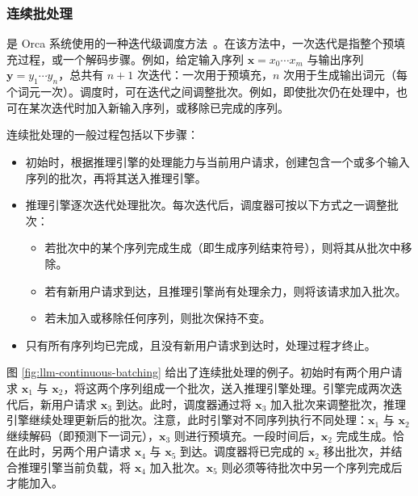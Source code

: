 \subsubsection{连续批处理}

是 Orca 系统使用的一种迭代级调度方法~\cite{yu-ettal:2022orca}。在该方法中，一次迭代是指整个预填充过程，或一个解码步骤。例如，给定输入序列 $\mathbf{x}=x_0\cdots x_m$ 与输出序列 $\mathbf{y}=y_1\cdots y_n$，总共有 $n+1$ 次迭代：一次用于预填充，$n$ 次用于生成输出词元（每个词元一次）。调度时，可在迭代之间调整批次。例如，即使批次仍在处理中，也可在某次迭代时加入新输入序列，或移除已完成的序列。

连续批处理的一般过程包括以下步骤：

\begin{itemize}
\item \vspace{0.3cm} 初始时，根据推理引擎的处理能力与当前用户请求，创建包含一个或多个输入序列的批次，再将其送入推理引擎。

\item \vspace{0.3em} 推理引擎逐次迭代处理批次。每次迭代后，调度器可按以下方式之一调整批次：
    \begin{itemize}
    \item \vspace{0.3em} 若批次中的某个序列完成生成（即生成序列结束符号），则将其从批次中移除。
    \item \vspace{0.3em} 若有新用户请求到达，且推理引擎尚有处理余力，则将该请求加入批次。
    \item \vspace{0.3em} 若未加入或移除任何序列，则批次保持不变。
    \end{itemize}

\item \vspace{0.3em} 只有所有序列均已完成，且没有新用户请求到达时，处理过程才终止。
\end{itemize}

\vspace{0.5em}

图 \ref{fig:llm-continuous-batching} 给出了连续批处理的例子。初始时有两个用户请求 $\mathbf{x}_1$ 与 $\mathbf{x}_2$，将这两个序列组成一个批次，送入推理引擎处理。引擎完成两次迭代后，新用户请求 $\mathbf{x}_3$ 到达。此时，调度器通过将 $\mathbf{x}_3$ 加入批次来调整批次，推理引擎继续处理更新后的批次。注意，此时引擎对不同序列执行不同处理：$\mathbf{x}_1$ 与 $\mathbf{x}_2$ 继续解码（即预测下一词元），$\mathbf{x}_3$ 则进行预填充。一段时间后，$\mathbf{x}_2$ 完成生成。恰在此时，另两个用户请求 $\mathbf{x}_4$ 与 $\mathbf{x}_5$ 到达。调度器将已完成的 $\mathbf{x}_2$ 移出批次，并结合推理引擎当前负载，将 $\mathbf{x}_4$ 加入批次。$\mathbf{x}_5$ 则必须等待批次中另一个序列完成后才能加入。


